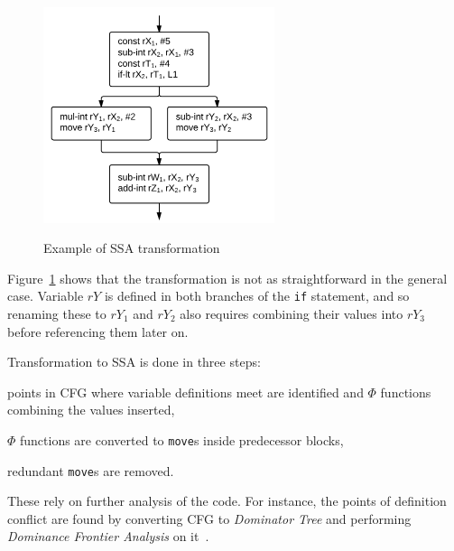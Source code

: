 \documentclass[12pt,twoside,notitlepage]{report}
\begin{document}
\begin{figure}
{  	\includegraphics[width=16pc]{figs/fig_implementation_ssa3.png}
  }
  \label{figure:Implementation_SSA3}

  \caption{Example of SSA transformation}
  \label{figure:Implementation_SSA}
\end{figure}

Figure~\ref{figure:Implementation_SSA} shows that the transformation is not as straightforward in the general case. Variable $rY$ is defined in both branches of the \texttt{if} statement, and so renaming these to $rY_1$ and $rY_2$ also requires combining their values into $rY_3$ before referencing them later on. 

Transformation to SSA is done in three steps:
\begin{inparaenum}[(i)]
\item points in CFG where variable definitions meet are identified and $\Phi$ functions combining the values inserted,
\item $\Phi$ functions are converted to \texttt{move}s inside predecessor blocks,
\item redundant \texttt{move}s are removed.
\end{inparaenum}
These rely on further analysis of the code. For instance, the points of definition conflict are found by converting CFG to \emph{Dominator Tree} and performing \emph{Dominance Frontier Analysis} on it~\cite{Appel:2003:MCI:599718}.
\end{document}
